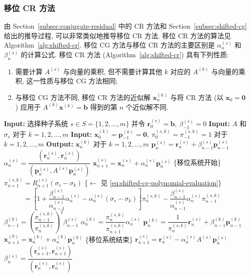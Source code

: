 \subsubsection{{移位 CR 方法}}\label{subsec:shifted-cr}
{由 Section\ \ref{subsec:conjugate-residual} 中的 CR 方法和 Section\ \ref{subsec:shifted-cg} 给出的推导过程, 可以非常类似地推导移位 CR 方法. 移位 CR 方法的算法见 Algorithm\ \ref{alg:shifted-cr}.}
{移位 CG 方法与移位 CR 方法的主要区别是 $\alpha_n^{(s)}$ 和 $\beta_n^{(s)}$ 的计算公式. 移位 CR 方法 (Algorithm\ \ref{alg:shifted-cr}) 具有下列性质:}
\begin{enumerate}
\item {需要计算 $A^{(s)}$ 与向量的乘积, 但不需要计算其他 $k$ 对应的 $A^{(k)}$ 与向量的乘积, 这一性质与移位 CG 方法相同;}
\item {与移位 CG 方法不同, 移位 CR 方法的近似解 $\bm x_n^{(k)}$ 与将 CR 方法 (以 $\bm x_0=\bm0$) 应用于 $A^{(k)}\bm x^{(k)}=\bm b$ 得到的第 $n$ 个近似解不同.}
\end{enumerate}
\begin{algorithm}[H]\caption{{移位 CG 方法}}\label{alg:shifted-cg}\begin{algorithmic}[1]
\Statex\textbf{Input:} {选择种子系统 $s\in S=\{1,2,\ldots,m\}$ 并令 $\bm r_0^{(s)}=\bm b,\ \beta_{-1}^{(s)}=0$}
\Statex\textbf{Input:} $A$ {和} $\sigma_s$ {对于} $k=1,2,\ldots,m$
\Statex\textbf{Input:} $\bm x_0^{(k)}=\bm p_{-1}^{(k)}=\bm0,\ \pi_0^{(s,k)}=\pi_{-1}^{(s,k)}=1$ {对于} $k=1,2,\ldots,m$
\Statex\textbf{Output:} $\bm x_n^{(k)}$ {对于} $k=1,2,\ldots,m$
\State $\bm p_n^{(s)}=\bm r_n^{(s)}+\beta_{n-1}^{(s)}\bm p_{n-1}^{(s)}$
\State $\alpha_n^{(s)}=\dfrac{(\bm r_n^{(s)},\bm r_n^{(s)})}{(\bm p_n^{(s)},A^{(s)}\bm p_n^{(s)})}$
\State $\bm x_{n+1}^{(s)}=\bm x_n^{(s)}+\alpha_n^{(s)}\bm p_n^{(s)}$
\State \{{移位系统开始}\}
\State $\pi_{n+1}^{(s,k)}=R_{n+1}^{(s)}(\sigma_s-\sigma_k)$ \{{$\leftarrow$ 见 \eqref{eq:shifted-cg-polynomial-evaluation}}\}
\State $\phantom{\pi_{n+1}^{(s,k)}}=\left[1+\dfrac{\beta_{n-1}^{(s)}}{\alpha_{n-1}^{(s)}}\alpha_n^{(s)}-\alpha_n^{(s)}(\sigma_s-\sigma_k)\right]\pi_n^{(s,k)}-\dfrac{\beta_{n-1}^{(s)}}{\alpha_{n-1}^{(s)}}\alpha_n^{(s)}\pi_{n-1}^{(s,k)}$
\State $\beta_{n-1}^{(k)}=\left(\dfrac{\pi_{n-1}^{(s,k)}}{\pi_n^{(s,k)}}\right)^2\beta_{n-1}^{(s)}$
\State $\alpha_n^{(k)}=\dfrac{\pi_n^{(s,k)}}{\pi_{n+1}^{(s,k)}}\alpha_n^{(s)}$
\State $\bm p_n^{(k)}=\dfrac1{\pi_n^{(s,k)}}\bm r_n^{(s)}+\beta_{n-1}^{(k)}\bm p_{n-1}^{(k)}$
\State $\bm x_{n+1}^{(k)}=\bm x_n^{(k)}+\alpha_n^{(k)}\bm p_n^{(k)}$
\EndIf\EndFor
\State \{{移位系统结束}\}
\State $\bm r_{n+1}^{(s)}=\bm r_n^{(s)}-\alpha_n^{(s)}A^{(s)}\bm p_n^{(s)}$
\State $\beta_n^{(s)}=\dfrac{(\bm r_{n+1}^{(s)},\bm r_{n+1}^{(s)})}{(\bm r_n^{(s)},\bm r_n^{(s)})}$
\EndFor\end{algorithmic}\end{algorithm}
